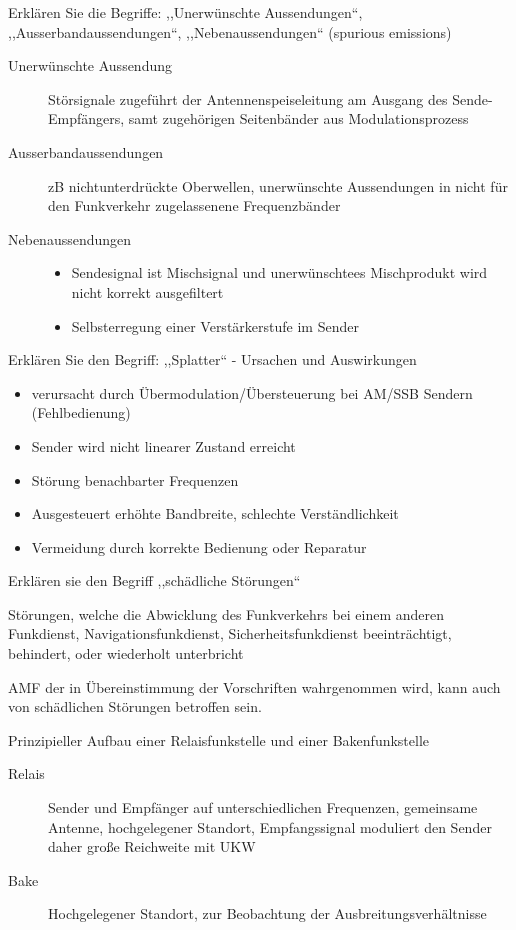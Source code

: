 \documentclass[avery5371,grid,frame,a4paper]{flashcards}
\newcommand{\card}[3]{
  \begin{flashcard}[{\chap} -- #1]{#2}#3\end{flashcard}
}
\begin{document}
\card{94}{Erklären Sie die Begriffe: ,,Unerwünschte Aussendungen``, ,,Ausserbandaussendungen``, ,,Nebenaussendungen`` (spurious emissions)}{
  \small
  \begin{description}
    \item[Unerwünschte Aussendung]
      Störsignale zugeführt der Antennenspeiseleitung am Ausgang des Sende-Empfängers,
      samt zugehörigen Seitenbänder aus Modulationsprozess
    \item[Ausserbandaussendungen]
      zB nichtunterdrückte Oberwellen, unerwünschte Aussendungen in nicht für den Funkverkehr zugelassenene Frequenzbänder
    \item[Nebenaussendungen]
      \begin{itemize}
        \item Sendesignal ist Mischsignal und unerwünschtees Mischprodukt wird nicht korrekt ausgefiltert
        \item Selbsterregung einer Verstärkerstufe im Sender
      \end{itemize}
  \end{description}
}
\card{95}{Erklären Sie den Begriff: ,,Splatter`` - Ursachen und Auswirkungen}{
  \begin{itemize}
    \item verursacht durch Übermodulation/Übersteuerung bei AM/SSB Sendern (Fehlbedienung)
    \item Sender wird nicht linearer Zustand erreicht
    \item Störung benachbarter Frequenzen
    \item Ausgesteuert erhöhte Bandbreite, schlechte Verständlichkeit
    \item Vermeidung durch korrekte Bedienung oder Reparatur
  \end{itemize}
}
\card{96}{Erklären sie den Begriff ,,schädliche Störungen``}{
  \item
  Störungen, welche die Abwicklung des Funkverkehrs bei einem anderen Funkdienst, Navigationsfunkdienst,
Sicherheitsfunkdienst beeinträchtigt, behindert, oder wiederholt unterbricht

  \item
  AMF der in Übereinstimmung der Vorschriften wahrgenommen wird, kann auch von schädlichen Störungen betroffen sein.
}
\card{97}{Prinzipieller Aufbau einer Relaisfunkstelle und einer Bakenfunkstelle}{
  \begin{description}
    \item[Relais] Sender und Empfänger auf unterschiedlichen Frequenzen, gemeinsame Antenne, hochgelegener Standort, Empfangssignal moduliert den Sender daher große Reichweite mit UKW
    \item[Bake] Hochgelegener Standort, zur Beobachtung der Ausbreitungsverhältnisse
  \end{description}
}
\end{document}
